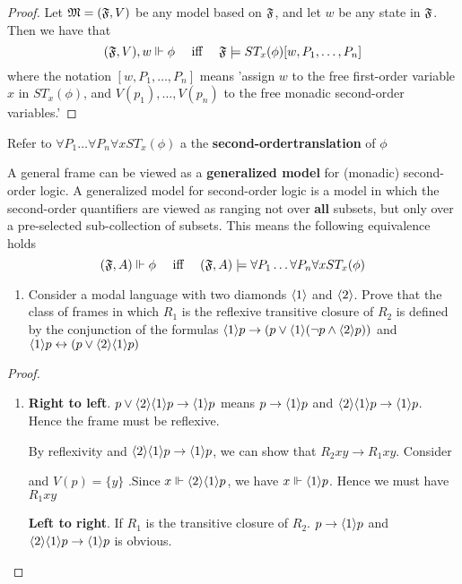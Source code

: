 \documentclass[11pt]{article}
\begin{document}
\begin{proof}
Let \(\mathfrak{M}=(\mathfrak{F},V)\) be any model based on \(\mathfrak{F}\), and let \(w\) be any state
in \(\mathfrak{F}\). Then we have that
\begin{equation*}
(\mathfrak{F},V),w\Vdash\phi \quad\text{ iff }\quad
\mathfrak{F}\models ST_x(\phi)[w,P_1,\dots,P_n]
\end{equation*}
where the notation \([w,P_1,\dots,P_n]\) means 'assign \(w\) to the free
first-order variable \(x\) in \(ST_x(\phi)\), and \(V(p_1),\dots,V(p_n)\) to the
free monadic second-order variables.' 
\end{proof}

Refer to \(\forall P_1\dots\forall P_n\forall xST_x(\phi)\) a the
\textbf{second-ordertranslation}  of \(\phi\)

A general frame can be viewed as a \textbf{generalized model} for (monadic)
second-order logic. A generalized model for second-order logic is a model in
which the second-order quantifiers are viewed as ranging not over \textbf{all}
subsets, but only over a pre-selected sub-collection of subsets. This means
the following equivalence holds
\begin{equation*}
(\mathfrak{F},A)\Vdash\phi \quad\text{ iff }\quad
(\mathfrak{F},A)\models\forall P_1\dots\forall P_n\forall x ST_x(\phi)
\end{equation*}
\begin{exercise}
\label{ex3.2.1}
\begin{enumerate}
\item Consider a modal language with two diamonds \(\langle1\rangle\) and \(\langle2\rangle\).
Prove that the class of frames in which \(R_1\) is the reflexive
transitive closure of \(R_2\) is defined by the conjunction of the
formulas \(\langle1\rangle p\to(p\vee\langle1\rangle(\neg p\wedge\langle2\rangle p))\)
and \(\langle1\rangle p\leftrightarrow(p\vee\langle2\rangle\langle1\rangle p)\)
\end{enumerate}
\end{exercise}

\begin{proof}
\begin{enumerate}
\item \textbf{Right to left}.
\(p\vee\langle2\rangle\langle1\rangle p\to\langle1\rangle p\) means \(p\to\langle1\rangle p\) and \(\langle2\rangle\langle1\rangle
      p\to\langle1\rangle p\). Hence the frame must be reflexive.

By reflexivity and \(\langle2\rangle\langle1\rangle p\to\langle1\rangle p\), we can show that
\(R_2xy\to R_1xy\). Consider
\begin{center}\end{center}
and \(V(p)=\{y\}\)
.Since \(x\Vdash\langle2\rangle\langle1\rangle p\), we have \(x\Vdash\langle1\rangle p\). Hence we
must have \(R_1xy\)

\textbf{Left to right}.
If \(R_1\) is the transitive closure of \(R_2\). \(p\to\langle1\rangle p\) and
\(\langle2\rangle\langle1\rangle p\to\langle1\rangle p\) is obvious.
\end{enumerate}
\end{proof}
\end{document}
